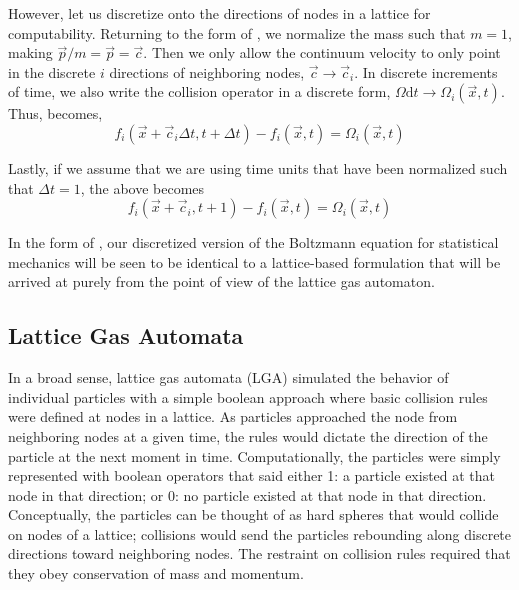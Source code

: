 However, let us discretize onto the directions of nodes in a lattice for computability. Returning to the form of , we normalize the mass such that $m=1$, making $\vec{p}/m = \vec{p}=\vec{c}$. Then we only allow the continuum velocity to only point in the discrete $i$ directions of neighboring nodes, $\vec{c}\rightarrow\vec{c}_i$. In discrete increments of time, we also write the collision operator in a discrete form, $\Omega\mathrm{d}t \rightarrow \Omega_i(\vec{x},t)$. Thus,  becomes,
\begin{equation}
	f_i(\vec{x}+\vec{c}_i\Delta t, t + \Delta t) - f_i(\vec{x},t) = \Omega_i(\vec{x},t)
\end{equation}

Lastly, if we assume that we are using time units that have been normalized such that $\Delta t = 1$, the above becomes
\begin{equation}\label{eq:boltzmann2lbe}
	f_i(\vec{x}+\vec{c}_i, t + 1) - f_i(\vec{x},t) = \Omega_i(\vec{x},t)
\end{equation}

In the form of , our discretized version of the Boltzmann equation for statistical mechanics will be seen to be identical to a lattice-based formulation that will be arrived at purely from the point of view of the lattice gas automaton.



\subsection{Lattice Gas Automata}

In a broad sense, lattice gas automata (LGA) simulated the behavior of individual particles with a simple boolean approach where basic collision rules were defined at nodes in a lattice. As particles approached the node from neighboring nodes at a given time, the rules would dictate the direction of the particle at the next moment in time. Computationally, the particles were simply represented with boolean operators that said either 1: a particle existed at that node in that direction; or 0: no particle existed at that node in that direction. Conceptually, the particles can be thought of as hard spheres that would collide on nodes of a lattice; collisions would send the particles rebounding along discrete directions toward neighboring nodes. The restraint on collision rules required that they obey conservation of mass and momentum. 

